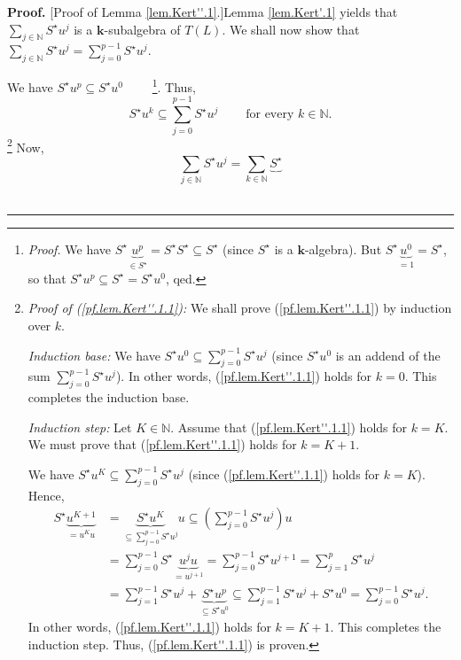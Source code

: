 \documentclass[numbers=enddot,12pt,final,onecolumn,notitlepage]{scrartcl}%
\theoremstyle{definition}
\newenvironment{proof}[1][Proof]{\noindent\textbf{#1.} }{\ \rule{0.5em}{0.5em}}
\let\sumnonlimits\sum
\renewcommand{\sum}{\sumnonlimits\limits}
\begin{document}
\begin{proof}
[Proof of Lemma \ref{lem.Kert''.1}.]Lemma \ref{lem.Kert'.1} yields that
$\sum_{j\in\mathbb{N}}S^{\star}u^{j}$ is a $\mathbf{k}$-subalgebra of
$T\left(  L\right)  $. We shall now show that $\sum_{j\in\mathbb{N}}S^{\star
}u^{j}=\sum_{j=0}^{p-1}S^{\star}u^{j}$.

We have $S^{\star}u^{p}\subseteq S^{\star}u^{0}$%
\ \ \ \ \footnote{\textit{Proof.} We have $S^{\star}\underbrace{u^{p}}_{\in
S^{\star}}=S^{\star}S^{\star}\subseteq S^{\star}$ (since $S^{\star}$ is a
$\mathbf{k}$-algebra). But $S^{\star}\underbrace{u^{0}}_{=1}=S^{\star}$, so
that $S^{\star}u^{p}\subseteq S^{\star}=S^{\star}u^{0}$, qed.}. Thus,%
\begin{equation}
S^{\star}u^{k}\subseteq\sum_{j=0}^{p-1}S^{\star}u^{j}%
\ \ \ \ \ \ \ \ \ \ \text{for every }k\in\mathbb{N}. \label{pf.lem.Kert''.1.1}%
\end{equation}
\footnote{\textit{Proof of (\ref{pf.lem.Kert''.1.1}):} We shall prove
(\ref{pf.lem.Kert''.1.1}) by induction over $k$.
\par
\textit{Induction base:} We have $S^{\star}u^{0}\subseteq\sum_{j=0}%
^{p-1}S^{\star}u^{j}$ (since $S^{\star}u^{0}$ is an addend of the sum
$\sum_{j=0}^{p-1}S^{\star}u^{j}$). In other words, (\ref{pf.lem.Kert''.1.1})
holds for $k=0$. This completes the induction base.
\par
\textit{Induction step:} Let $K\in\mathbb{N}$. Assume that
(\ref{pf.lem.Kert''.1.1}) holds for $k=K$. We must prove that
(\ref{pf.lem.Kert''.1.1}) holds for $k=K+1$.
\par
We have $S^{\star}u^{K}\subseteq\sum_{j=0}^{p-1}S^{\star}u^{j}$ (since
(\ref{pf.lem.Kert''.1.1}) holds for $k=K$). Hence,%
\begin{align*}
S^{\star}\underbrace{u^{K+1}}_{=u^{K}u}  &  =\underbrace{S^{\star}u^{K}%
}_{\subseteq\sum_{j=0}^{p-1}S^{\star}u^{j}}u\subseteq\left(  \sum_{j=0}%
^{p-1}S^{\star}u^{j}\right)  u\\
&  =\sum_{j=0}^{p-1}S^{\star}\underbrace{u^{j}u}_{=u^{j+1}}=\sum_{j=0}%
^{p-1}S^{\star}u^{j+1}=\sum_{j=1}^{p}S^{\star}u^{j}\\
&  =\sum_{j=1}^{p-1}S^{\star}u^{j}+\underbrace{S^{\star}u^{p}}_{\subseteq
S^{\star}u^{0}}\subseteq\sum_{j=1}^{p-1}S^{\star}u^{j}+S^{\star}u^{0}%
=\sum_{j=0}^{p-1}S^{\star}u^{j}.
\end{align*}
In other words, (\ref{pf.lem.Kert''.1.1}) holds for $k=K+1$. This completes
the induction step. Thus, (\ref{pf.lem.Kert''.1.1}) is proven.} Now,%
\[
\sum_{j\in\mathbb{N}}S^{\star}u^{j}=\sum_{k\in\mathbb{N}}\underbrace{S^{\star
}}\]
\end{proof}
\end{document}
